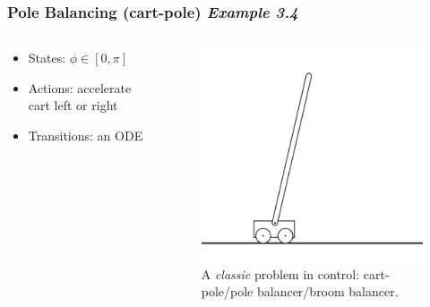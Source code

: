 \documentclass{beamer}
\begin{document}
\begin{frame}
  \frametitle{Pole Balancing (cart-pole) {\em Example 3.4} \cite{Sutton2018}}
  \begin{columns}[T]
    \begin{column}{.5\textwidth}
      \begin{itemize}
      \item States: $\phi \in [0, \pi]$
      \item Actions: accelerate cart left or right
      \item Transitions: an ODE
      \end{itemize}
    \end{column}
    \begin{column}{.5\textwidth}
      \begin{figure}
        \label{fig:cart-pole}
        \includegraphics[width=.8\textwidth]{../images/sutton2018_cartpole.png}
        \caption{A {\em classic} problem in control: cart-pole/pole balancer/broom balancer.}
      \end{figure}
    \end{column}
  \end{columns}
\end{frame}
  
\end{document}
